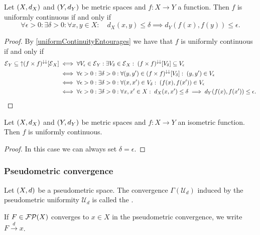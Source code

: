 \begin{lemma} \label{uniformContinuityMetricSpaces}
Let $\sSet{X, d_X}$ and $\sSet{Y, d_Y}$ be metric spaces and $f:X\to Y$ a function. Then $f$ is uniformly continuous \textup{if and only if}
\[ \forall \epsilon >0: \exists \delta >0: \forall x,y\in X: \quad d_X(x,y) \leq \delta \implies d_Y(f(x), f(y)) \leq \epsilon. \]
\end{lemma}
\begin{proof}
By \ref{uniformContinuityEntourages} we have that $f$ is uniformly continuous \textup{if and only if}
\begin{align*}
\operatorname{\mathcal{E}}_Y \subseteq \operatorname{\uparrow}(f\times f)^{\downarrow\downarrow}[\operatorname{\mathcal{E}}_X] &\iff \forall V_\epsilon \in \operatorname{\mathcal{E}}_Y: \exists V_\delta \in \operatorname{\mathcal{E}}_X: \; (f\times f)^{\downarrow\downarrow}[V_\delta] \subseteq V_\epsilon \\
&\iff \forall \epsilon>0: \exists \delta>0: \forall (y,y')\in (f\times f)^{\downarrow\downarrow}[V_\delta]: \; (y,y')\in V_\epsilon \\
&\iff \forall \epsilon>0: \exists \delta>0: \forall (x,x')\in V_\delta:\; (f(x),f(x'))\in V_\epsilon \\
&\iff \forall \epsilon>0: \exists \delta>0: \forall x,x'\in X: \; d_X(x,x')\leq \delta \implies d_Y(f(x),f(x'))\leq \epsilon.
\end{align*}
\end{proof}
\begin{corollary} \label{isometriesUniformlyContinuous}
Let $\sSet{X, d_X}$ and $\sSet{Y, d_Y}$ be metric spaces and $f:X\to Y$ an isometric function. Then $f$ is uniformly continuous.
\end{corollary}
\begin{proof}
In this case we can always set $\delta = \epsilon$.
\end{proof}

\subsubsection{Pseudometric convergence}
\begin{definition}
Let $\sSet{X,d}$ be a pseudometric space. The convergence $\Gamma(\mathcal{U}_d)$ induced by the pseudometric uniformity $\mathcal{U}_d$ is called the .

If $F\in\operatorname{\mathcal{FP}}(X)$ converges to $x\in X$ in the pseudometric convergence, we write $F\overset{d}{\longrightarrow} x$.
\end{definition}

